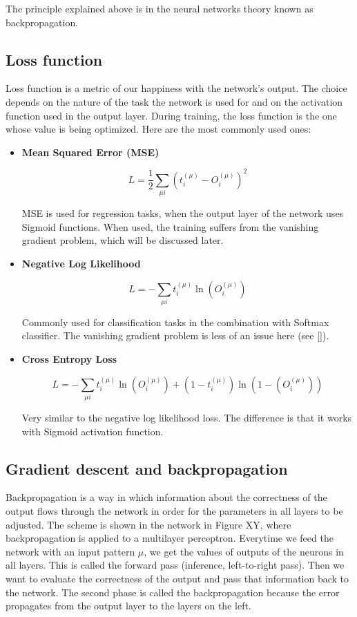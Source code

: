 The principle explained above is in the neural networks theory known as backpropagation.

\subsection{Loss function}

Loss function is a metric of our happiness with the network's output. The choice depends on the nature of the task the network is used for and on the activation function used in the output layer. During training, the loss function is the one whose value is being optimized. Here are the most commonly used ones:

\begin{itemize}
\item \textbf{Mean Squared Error (MSE)}

$$ 	
L =  \frac{1}{2} \sum\limits_{\mu i} \left( t_{i}^{(\mu)} - O_{i}^{(\mu)} \right)^2
$$

MSE is used for regression tasks, when the output layer of the network uses Sigmoid functions. When used, the training suffers from the vanishing gradient problem, which will be discussed later. 

\item \textbf{Negative Log Likelihood} 

$$ 	
L = - \sum\limits_{\mu i}  t_{i}^{(\mu)} \ln (O_{i}^{(\mu)})
$$

Commonly used for classification tasks in the combination with Softmax classifier. The vanishing gradient problem is less of an issue here (see []).

\item \textbf{Cross Entropy Loss} 

$$ 	
L = - \sum\limits_{\mu i}  t_{i}^{(\mu)} \ln (O_{i}^{(\mu)}) + (1 - t_{i}^{(\mu)}) \ln (1 - (O_{i}^{(\mu)}))
$$

Very similar to the negative log likelihood loss. The difference is that it works with Sigmoid activation function.
\end{itemize}  

\subsection{Gradient descent and backpropagation}

Backpropagation is a way in which information about the correctness of the output flows through the network in order for the parameters in all layers to be adjusted. The scheme is shown in the network in Figure XY, where backpropagation is applied to a multilayer perceptron. Everytime we feed the network with an input pattern $ \mu $, we get the values of outputs of the neurons in all layers. This is called the forward pass (inference, left-to-right pass). Then we want to evaluate the correctness of the output and pass that information back to the network. The second phase is called the backpropagation because the error propagates from the output layer to the layers on the left.   

